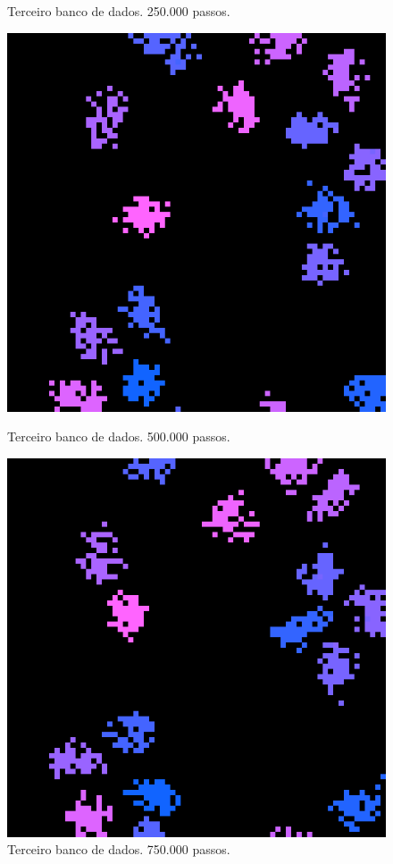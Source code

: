 \documentclass[conference]{IEEEtran}
\begin{document}
\begin{figure}[H]
\begin{minipage}[b]{0.5\linewidth}
    \caption{Terceiro banco de dados. 250.000 passos.} 
    \vspace{4ex}
  \end{minipage} 
  \begin{minipage}[b]{0.5\linewidth}
    \centering
    \includegraphics[width=.8\linewidth]{resultados/data/dataset_three/2-2.png} 
    \caption{Terceiro banco de dados. 500.000 passos.} 
    \vspace{4ex}
  \end{minipage}%
  \begin{minipage}[b]{0.5\linewidth}
    \centering
    \includegraphics[width=.8\linewidth]{resultados/data/dataset_three/2-3.png} 
    \caption{Terceiro banco de dados. 750.000 passos.} 
    \vspace{4ex}
  \end{minipage}
\end{figure}
\end{document}
